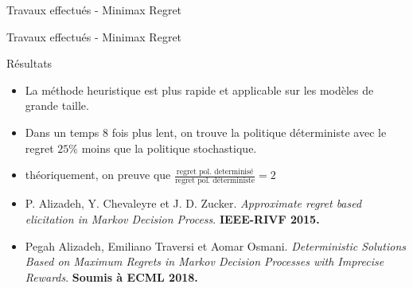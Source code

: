 \documentclass{beamer}
\begin{document}
{{\begin{frame}{Travaux effectués - Minimax Regret }
\end{frame}

\begin{frame}{Travaux effectués - Minimax Regret }

\begin{block}{Résultats}
\begin{itemize}
\item La méthode heuristique est plus rapide et applicable sur les modèles de grande taille.
\item Dans un temps $8$ fois plus lent, on trouve la politique déterministe avec le regret 	$25 \%$ moins que la politique stochastique.  
\item théoriquement, on preuve que 
	$\frac{\text{regret pol. determinisé}}{\text{regret pol. déterministe}} = 2 $
\end{itemize}
\end{block}

\begin{itemize}
\small
\item  P. Alizadeh, Y. Chevaleyre et J. D. Zucker. \textit{Approximate regret based elicitation in Markov Decision Process}. \textbf{IEEE-RIVF 2015.} 
\item Pegah Alizadeh, Emiliano Traversi et Aomar Osmani. \textit{Deterministic Solutions Based on Maximum Regrets in Markov Decision Processes with Imprecise Rewards}. \textbf{Soumis à ECML 2018.}
\end{itemize}

\end{frame}



%
%
%
%
%

}}
\end{document}
